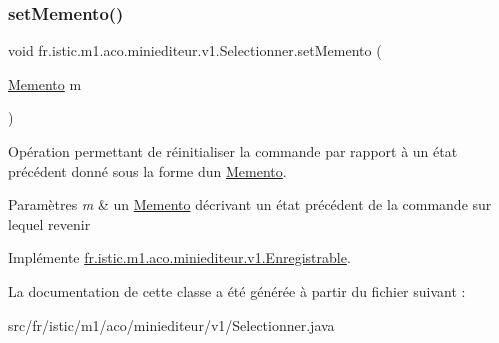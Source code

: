 \subsubsection{\texorpdfstring{set\+Memento()}{setMemento()}}
{\footnotesize\ttfamily void fr.\+istic.\+m1.\+aco.\+miniediteur.\+v1.\+Selectionner.\+set\+Memento (\begin{DoxyParamCaption}\item[{\hyperlink{interfacefr_1_1istic_1_1m1_1_1aco_1_1miniediteur_1_1v1_1_1Memento}{Memento}}]{m }\end{DoxyParamCaption})}



Opération permettant de réinitialiser la commande par rapport à un état précédent donné sous la forme d\textquotesingle{}un \hyperlink{interfacefr_1_1istic_1_1m1_1_1aco_1_1miniediteur_1_1v1_1_1Memento}{Memento}. 


\begin{DoxyParams}{Paramètres}
{\em m} & un \hyperlink{interfacefr_1_1istic_1_1m1_1_1aco_1_1miniediteur_1_1v1_1_1Memento}{Memento} décrivant un état précédent de la commande sur lequel revenir \\
\hline
\end{DoxyParams}


Implémente \hyperlink{interfacefr_1_1istic_1_1m1_1_1aco_1_1miniediteur_1_1v1_1_1Enregistrable_a949bb6784743800c2d743def265f41b1}{fr.\+istic.\+m1.\+aco.\+miniediteur.\+v1.\+Enregistrable}.



La documentation de cette classe a été générée à partir du fichier suivant \+:\begin{DoxyCompactItemize}
\item 
src/fr/istic/m1/aco/miniediteur/v1/Selectionner.\+java\end{DoxyCompactItemize}
